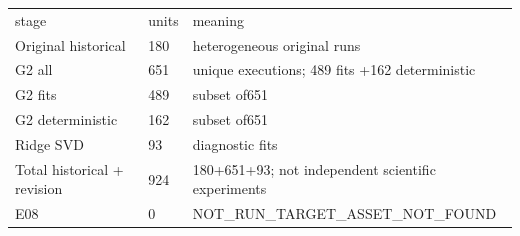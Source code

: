 \begin{longtable}{lll}
stage & units & meaning \\
Original historical & 180 & heterogeneous original runs \\
G2 all & 651 & unique executions; 489 fits +162 deterministic \\
G2 fits & 489 & subset of651 \\
G2 deterministic & 162 & subset of651 \\
Ridge SVD & 93 & diagnostic fits \\
Total historical + revision & 924 & 180+651+93; not independent scientific experiments \\
E08 & 0 & NOT\_RUN\_TARGET\_ASSET\_NOT\_FOUND \\
\end{longtable}
